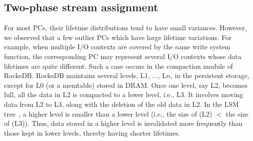 \subsection{Two-phase stream assignment}

For most PCs, their lifetime distributions tend to have small variances.  
However, we observed that a few outlier PCs which have large lifetime variations. 
For example, when multiple I/O contexts are covered by the same write system function, 
the corresponding PC may represent several I/O contexts whose data lifetimes are quite different.   
Such a case occurs %
in the compaction module of RocksDB.
RocksDB maintains
several levels, L1, ..., L$n$, in the persistent storage, except for L0 (or a
memtable) stored in DRAM.  Once one level, say L2, becomes full, all the data
in L2 is compacted to a lower level, i.e., L3.  It involves moving data from L2
to L3, along with the deletion of the old data in L2.  In the
LSM tree~\cite{LSM}, a higher level is smaller than a lower level 
(i.e., the size of (L2) $<$ the size of (L3)). 
Thus, data stored in a higher level is invalidated more frequently than those kept
in lower levels, thereby having shorter lifetimes.



